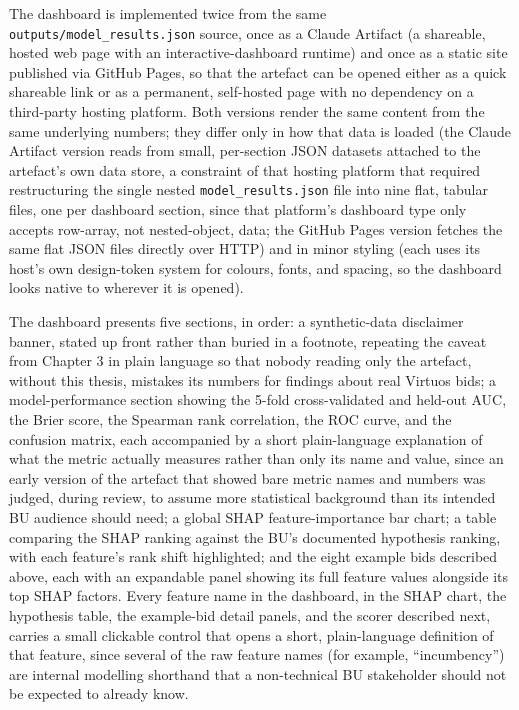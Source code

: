 \documentclass[12pt,oneside]{report}
\begin{document}
The dashboard is implemented twice from the same
\texttt{outputs/model\_results.json} source, once as a Claude Artifact
(a shareable, hosted web page with an interactive-dashboard runtime) and
once as a static site published via GitHub Pages, so that the artefact
can be opened either as a quick shareable link or as a permanent,
self-hosted page with no dependency on a third-party hosting platform.
Both versions render the same content from the same underlying numbers;
they differ only in how that data is loaded (the Claude Artifact version
reads from small, per-section JSON datasets attached to the artefact's
own data store, a constraint of that hosting platform that required
restructuring the single nested \texttt{model\_results.json} file into
nine flat, tabular files, one per dashboard section, since that
platform's dashboard type only accepts row-array, not nested-object,
data; the GitHub Pages version fetches the same flat JSON files directly
over HTTP) and in minor styling (each uses its host's own design-token
system for colours, fonts, and spacing, so the dashboard looks native to
wherever it is opened).

The dashboard presents five sections, in order: a synthetic-data
disclaimer banner, stated up front rather than buried in a footnote,
repeating the caveat from Chapter 3 in plain language so that nobody
reading only the artefact, without this thesis, mistakes its numbers for
findings about real Virtuos bids; a model-performance section showing
the 5-fold cross-validated and held-out AUC, the Brier score, the
Spearman rank correlation, the ROC curve, and the confusion matrix, each
accompanied by a short plain-language explanation of what the metric
actually measures rather than only its name and value, since an early
version of the artefact that showed bare metric names and numbers was
judged, during review, to assume more statistical background than its
intended BU audience should need; a global SHAP feature-importance bar
chart; a table comparing the SHAP ranking against the BU's documented
hypothesis ranking, with each feature's rank shift highlighted; and the
eight example bids described above, each with an expandable panel
showing its full feature values alongside its top SHAP factors. Every
feature name in the dashboard, in the SHAP chart, the hypothesis table,
the example-bid detail panels, and the scorer described next, carries a
small clickable control that opens a short, plain-language definition of
that feature, since several of the raw feature names (for example,
``incumbency'') are internal modelling shorthand that a non-technical BU
stakeholder should not be expected to already know.
\end{document}

